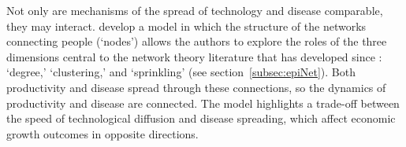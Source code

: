 

Not only are mechanisms of the spread of technology and disease comparable, they may interact.   develop a model in which the structure of the networks connecting people (`nodes') allows the authors to explore the roles of the three dimensions central to the network theory literature that has developed since \cite{erdos1960evolution}: `degree,' `clustering,' and `sprinkling' (see section~\ref{subsec:epiNet}).  Both productivity and disease spread through these connections, so the dynamics of productivity and disease are connected.  The model highlights a trade-off between the speed of technological diffusion and disease spreading, which affect economic growth outcomes in opposite directions.

